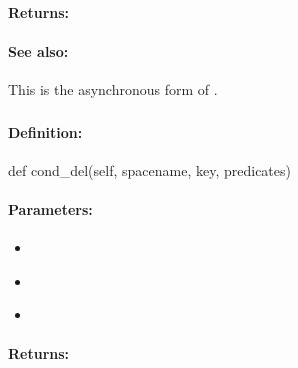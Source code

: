 \paragraph{Returns:}


\paragraph{See also:}  This is the asynchronous form of .

\pagebreak
\subsubsection{}
\label{api:python:cond_del}


\paragraph{Definition:}
\begin{pythoncode}
def cond_del(self, spacename, key, predicates)
\end{pythoncode}

\paragraph{Parameters:}
\begin{itemize}[noitemsep]
\item {}\\

\item {}\\

\item {}\\

\end{itemize}

\paragraph{Returns:}


\pagebreak
\subsubsection{}
\label{api:python:async_cond_del}


